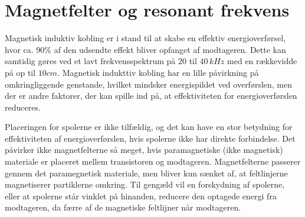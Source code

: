 \section{Magnetfelter og resonant frekvens}

Magnetisk induktiv kobling er i stand til at skabe en effektiv energioverførsel, hvor ca. $90\%$ af den udsendte effekt bliver opfanget af modtageren. Dette kan samtidig gøres ved et lavt frekvensspektrum på $20$ til $40 \, kHz$ med en rækkevidde på op til $10cm$. Magnetisk indukttiv kobling har en lille påvirkning på omkringliggende genstande, hvilket mindsker energispildet ved overførslen, men der er andre faktorer, der kan spille ind på, at effektiviteten for energioverførslen reduceres.

Placeringen for spolerne er ikke tilfældig, og det kan have en stor betydning for effektiviteten af energioverførslen, hvis spolerne ikke har direkte forbindelse. Det påvirker ikke magnetfelterne så meget, hvis paramagnetiske (ikke magnetisk) materiale er placeret mellem transistoren og modtageren. Magnetfelterne passerer gennem det paramegnetisk materiale, men bliver kun sænket af, at feltlinjerne magnetiserer partiklerne omkring. Til gengæld vil en forskydning af spolerne, eller at spolerne står vinklet på hinanden, reducere den optagede energi fra modtageren, da færre af de magnetiske feltlijner når modtageren. \cite{fysikbog}

